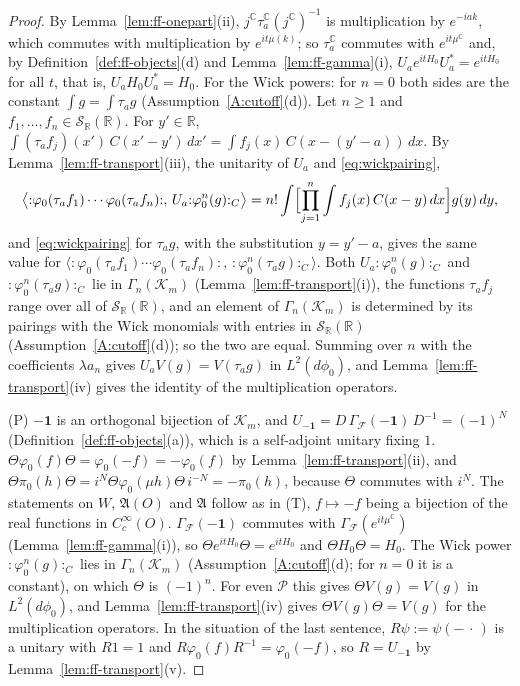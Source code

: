 \documentclass[11pt,a4paper]{article}
\theoremstyle{plain}
\theoremstyle{definition}
\theoremstyle{plain}
\theoremstyle{definition}
\newcommand{\R}{\mathbb{R}}
\newcommand{\C}{\mathbb{C}}
\newcommand{\A}{\mathfrak{A}}
\begin{document}
\begin{proof}
By Lemma~\ref{lem:ff-onepart}(ii), $j^{\C}\tau_a^{\C}(j^{\C})^{-1}$ is multiplication by
$e^{-iak}$, which commutes with multiplication by $e^{it\mu(k)}$; so $\tau_a^{\C}$ commutes with
$e^{it\mu^{\C}}$ and, by Definition~\ref{def:ff-objects}(d) and Lemma~\ref{lem:ff-gamma}(i),
$U_ae^{itH_0}U_a^*=e^{itH_0}$ for all $t$, that is, $U_aH_0U_a^*=H_0$.  For the Wick powers:
for $n=0$ both sides are the constant $\int g=\int\tau_ag$ (Assumption~\ref{A:cutoff}(d)).
Let $n\ge1$ and $f_1,\dots,f_n\in\mathcal S_\R(\R)$.  For $y'\in\R$,
$\int(\tau_af_j)(x')\,C(x'-y')\,dx'=\int f_j(x)\,C(x-(y'-a))\,dx$.  By
Lemma~\ref{lem:ff-transport}(iii), the unitarity of $U_a$ and \eqref{eq:wickpairing},
\[
 \bigl\langle{:}\varphi_0(\tau_af_1)\cdots\varphi_0(\tau_af_n){:},\,U_a{:}\varphi_0^n(g){:}_C
 \bigr\rangle=n!\int\Bigl[\prod_{j=1}^n\int f_j(x)\,C(x-y)\,dx\Bigr]g(y)\,dy ,
\]
and \eqref{eq:wickpairing} for $\tau_ag$, with the substitution $y=y'-a$, gives the same value
for $\bigl\langle{:}\varphi_0(\tau_af_1)\cdots\varphi_0(\tau_af_n){:},\,
{:}\varphi_0^n(\tau_ag){:}_C\bigr\rangle$.  Both $U_a{:}\varphi_0^n(g){:}_C$ and
${:}\varphi_0^n(\tau_ag){:}_C$ lie in $\Gamma_n(\mathcal K_m)$
(Lemma~\ref{lem:ff-transport}(i)), the functions $\tau_af_j$ range over all of
$\mathcal S_\R(\R)$, and an element of $\Gamma_n(\mathcal K_m)$ is determined by its pairings
with the Wick monomials with entries in $\mathcal S_\R(\R)$ (Assumption~\ref{A:cutoff}(d)); so
the two are equal.  Summing over $n$ with the coefficients $\lambda a_n$ gives
$U_aV(g)=V(\tau_ag)$ in $L^2(d\phi_0)$, and Lemma~\ref{lem:ff-transport}(iv) gives the
identity of the multiplication operators.

(P) $-\mathbf 1$ is an orthogonal bijection of $\mathcal K_m$, and
$U_{-\mathbf 1}=D\,\Gamma_{\!\mathcal F}(-\mathbf 1)\,D^{-1}=(-1)^N$
(Definition~\ref{def:ff-objects}(a)), which is a self-adjoint unitary fixing $1$.
$\Theta\varphi_0(f)\Theta=\varphi_0(-f)=-\varphi_0(f)$ by Lemma~\ref{lem:ff-transport}(ii), and
$\Theta\pi_0(h)\Theta=i^N\Theta\varphi_0(\mu h)\Theta\,i^{-N}=-\pi_0(h)$, because $\Theta$
commutes with $i^N$.  The statements on $W$, $\A(O)$ and $\A$ follow as in (T), $f\mapsto-f$
being a bijection of the real functions in $C_c^\infty(O)$.  $\Gamma_{\!\mathcal F}(-\mathbf 1)$
commutes with $\Gamma_{\!\mathcal F}(e^{it\mu^{\C}})$ (Lemma~\ref{lem:ff-gamma}(i)), so
$\Theta e^{itH_0}\Theta=e^{itH_0}$ and $\Theta H_0\Theta=H_0$.  The Wick power
${:}\varphi_0^n(g){:}_C$ lies in $\Gamma_n(\mathcal K_m)$ (Assumption~\ref{A:cutoff}(d); for
$n=0$ it is a constant), on which $\Theta$ is $(-1)^n$.  For even $\mathscr P$ this gives
$\Theta V(g)=V(g)$ in $L^2(d\phi_0)$, and Lemma~\ref{lem:ff-transport}(iv) gives
$\Theta V(g)\Theta=V(g)$ for the multiplication operators.  In the situation of the last
sentence, $R\psi:=\psi(-\,\cdot\,)$ is a unitary with $R1=1$ and $R\varphi_0(f)R^{-1}=
\varphi_0(-f)$, so $R=U_{-\mathbf 1}$ by Lemma~\ref{lem:ff-transport}(v).


\end{proof}
\end{document}
